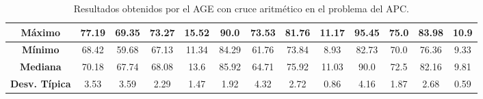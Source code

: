 \documentclass[11pt,a4paper]{article}
\begin{document}
\begin{table}[H]
{\begin{tabular}{c|c|c|c|c|c|c|c|c|c|c|c|c|}
\multicolumn{1}{|c|}{\textbf{Máximo}}       & 77.19             & 69.35                   & 73.27         & 15.52      & 90.0              & 73.53          & 81.76         & 11.17      & 95.45             & 75.0           & 83.98         & 10.9       \\ \hline
\multicolumn{1}{|c|}{\textbf{Mínimo}}       & 68.42             & 59.68                   & 67.13         & 11.34      & 84.29             & 61.76          & 73.84         & 8.93       & 82.73             & 70.0           & 76.36         & 9.33       \\ \hline
\multicolumn{1}{|c|}{\textbf{Mediana}}      & 70.18             & 67.74                   & 68.08         & 13.6       & 85.92             & 64.71          & 75.92         & 11.03      & 90.0              & 72.5           & 82.16         & 9.81       \\ \hline
\multicolumn{1}{|c|}{\textbf{Desv. Típica}} & 3.53              & 3.59                    & 2.29          & 1.47       & 1.92              & 4.32           & 2.72          & 0.86       & 4.16              & 1.87           & 2.68          & 0.59       \\ \hline
\end{tabular}
}%
\caption{Resultados obtenidos por el AGE con cruce aritmético en el problema del APC.}
\end{table}
\end{document}
